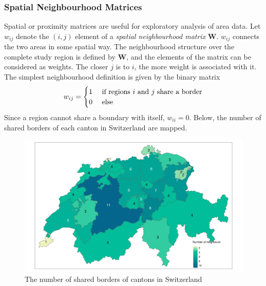 \subsubsection{Spatial Neighbourhood Matrices}
Spatial or proximity matrices are useful for exploratory analysis of area data. Let $w_{ij}$ denote the $\left(i,j\right)$ element of a \textit{spatial neighbourhood matrix} $\pmb{W}$. $w_{ij}$ connects the two areas in some spatial way. The neighbourhood structure over the complete study region is defined by $\pmb{W}$, and the elements of the matrix can be considered as weights. The closer $j$ is to $i$, the more weight is associated with it. The simplest neighbourhood definition is given by the binary matrix
\begin{equation}
    w_{ij}=\begin{cases}
    1 & \hbox{ if regions } i $\hbox{ and }$ j \hbox{ share a border} \\
    0 & \hbox{ else }
    \end{cases}
\end{equation}
Since a region cannot share a boundary with itself, $w_{ii}=0$.  Below, the number of shared borders of each canton in Switzerland are mapped.
\begin{figure}[H]
   \centering
       \includegraphics[page=1,width=\textwidth]{neighbours.pdf}
 \caption{The number of shared borders of cantons in Switzerland}
 \label{fig:neighbour}
\end{figure}
